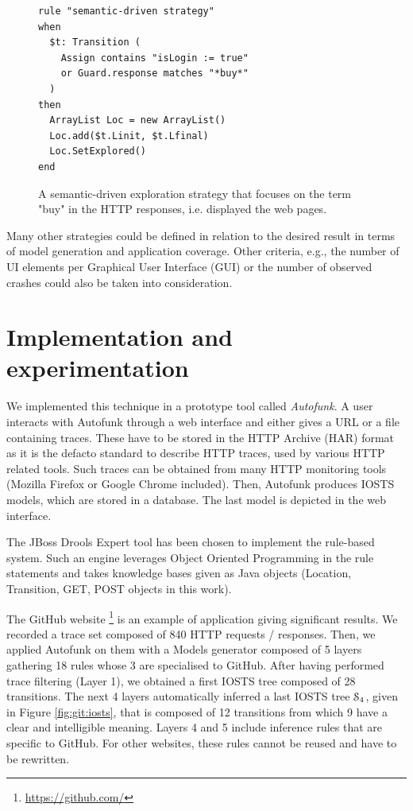 \begin{figure}[h]
\begin{framed}
\begin{BVerbatim}
rule "semantic-driven strategy"
when
  $t: Transition (
    Assign contains "isLogin := true"
    or Guard.response matches "*buy*"
  )
then
  ArrayList Loc = new ArrayList()
  Loc.add($t.Linit, $t.Lfinal)
  Loc.SetExplored()
end
\end{BVerbatim}
\end{framed}

\caption{A semantic-driven exploration strategy that focuses on
the term "buy" in the HTTP responses, i.e. displayed the web
pages.}
\label{fig:rule:semdriven}
\end{figure}

Many other strategies could be defined in relation to the desired
result in terms of model generation and application coverage.
Other criteria, e.g., the number of UI elements per Graphical User
Interface (GUI) or the number of observed crashes could also be
taken into consideration.


\section{Implementation and experimentation}
\label{sec:modelinf:webapps:exp}

We implemented this technique in a prototype tool called
\textit{Autofunk}. A user interacts with Autofunk through a web
interface and either gives a URL  or a file containing traces.
These have to be stored in the HTTP Archive (HAR) format as it is
the defacto standard to describe HTTP traces, used by various
HTTP related tools. Such traces can be obtained from many HTTP
monitoring tools (Mozilla Firefox or Google Chrome included).
Then, Autofunk produces IOSTS models, which are stored in a
database. The last model is depicted in the web interface.

The JBoss Drools Expert tool has been chosen to implement the
rule-based system. Such an engine leverages Object Oriented
Programming in the rule statements and takes knowledge bases
given as Java objects (Location, Transition, GET, POST objects in
this work).

The GitHub website \footnote{\url{https://github.com/}} is an example
of application giving significant results. We recorded a trace
set composed of 840 HTTP requests / responses. Then, we applied
Autofunk on them with a Models generator composed of 5 layers
gathering 18 rules whose 3 are specialised to GitHub. After
having performed trace filtering (Layer 1), we obtained a first
IOSTS tree composed of 28 transitions. The next 4 layers
automatically inferred a last IOSTS tree $\EuScript{S}_4$, given
in Figure \ref{fig:git:iosts}, that is composed of 12 transitions
from which 9 have a clear and intelligible meaning. Layers 4 and
5 include inference rules that are specific to GitHub. For other
websites, these rules cannot be reused and have to be rewritten.

